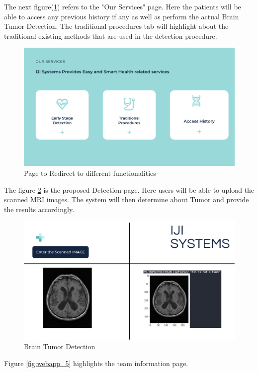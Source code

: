 The next figure(\ref{fig:webapp_3}) refers to the "Our Services" page. Here the patients will be able to access any previous history if any as well as perform the actual Brain Tumor Detection. The traditional procedures tab will highlight about the traditional existing methods that are used in the detection procedure.
\begin{figure}[H]
\includegraphics[scale=0.45]{Photos/webapp_3.png}
\caption{Page to Redirect to different functionalities} \label{fig:webapp_3}
\end{figure}
The figure \ref{fig:webapp_4} is the proposed Detection page. Here users will be able to upload the scanned MRI images. The system will then determine about Tumor and provide the results accordingly.
\begin{figure}[H]
\includegraphics[scale=0.45]{Photos/webapp_4.png}
\caption{Brain Tumor Detection} \label{fig:webapp_4}
\end{figure}
Figure \ref{fig:webapp_5} highlights the team information page.
